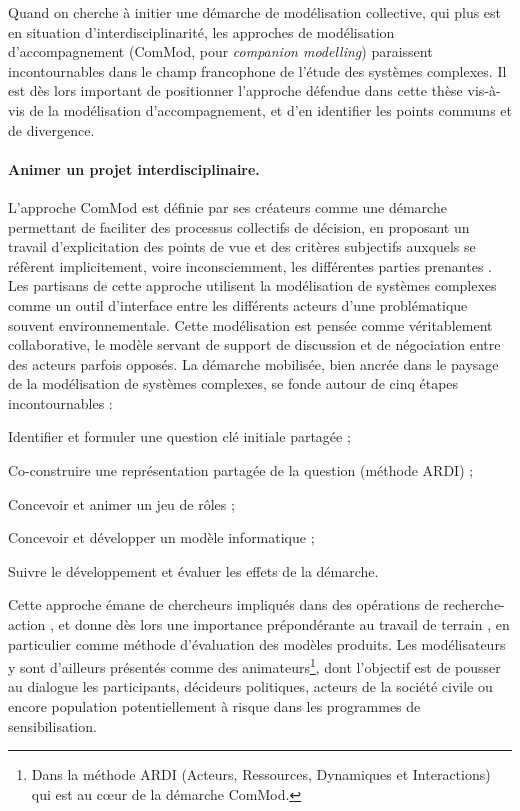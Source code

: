 Quand on cherche à initier une démarche de modélisation collective, qui plus est en situation d'interdisciplinarité, les approches de \og modélisation d'accompagnement\fg{} (\og ComMod\fg{}, pour \textit{companion modelling}) paraissent incontournables dans le champ francophone de l'étude des systèmes complexes.
Il est dès lors important de positionner l'approche défendue dans cette thèse vis-à-vis de la modélisation d'accompagnement, et d'en identifier les points communs et de divergence.

\paragraph{Animer un projet interdisciplinaire.}

L'approche ComMod est définie par ses créateurs comme \og une démarche permettant de faciliter des processus collectifs de décision, en proposant un travail d'explicitation des points de vue et des critères subjectifs auxquels se réfèrent implicitement, voire inconsciemment, les différentes parties prenantes\fg{} \autocite[167]{commod_modelisation_2005}.
Les partisans de cette approche utilisent la modélisation de systèmes complexes comme un outil d'interface entre les différents acteurs d'une problématique souvent environnementale.
Cette modélisation est pensée comme véritablement collaborative, le modèle servant de support de discussion et de négociation entre des acteurs parfois opposés.
La démarche mobilisée, bien ancrée dans le paysage de la modélisation de systèmes complexes, se fonde autour de \og cinq étapes incontournables\fg{} \autocite[41-132]{etienne_modelisation_2015} :
\begin{compactenum}\vspace*{-0.5em}
	\item Identifier et formuler une question clé initiale partagée ;
	\item Co-construire une représentation partagée de la question (méthode \og ARDI\fg{}) ;
	\item Concevoir et animer un jeu de rôles ;
	\item Concevoir et développer un modèle informatique ;
	\item Suivre le développement et évaluer les effets de la démarche.
\end{compactenum}\vspace*{-0.5em}

Cette approche émane de chercheurs impliqués dans des opérations de \og recherche-action\fg{} \autocite[165]{commod_modelisation_2005}, et donne dès lors une importance prépondérante au travail de terrain \autocite[3.3]{barreteau_our_2003}, en particulier comme méthode d'évaluation des modèles produits.
Les modélisateurs y sont d'ailleurs présentés comme des \og animateurs\fg{}\footnote{
	Dans la méthode \og ARDI \fg{} (Acteurs, Ressources, Dynamiques et Interactions) \autocite{etienne_co-construction_2009} qui est au cœur de la démarche ComMod.
}, dont l'objectif est de pousser au dialogue les \og participants\fg{}, décideurs politiques, acteurs de la société civile ou encore population potentiellement à risque dans les programmes de sensibilisation.

